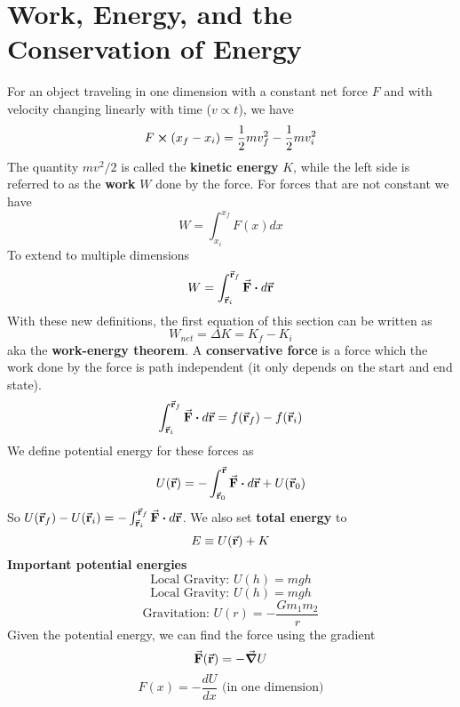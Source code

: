 \section{Work, Energy, and the Conservation of Energy}
    For an object traveling in one dimension with a constant net force $F$ and with velocity changing linearly with time ($v \propto t$), we have
    \begin{equation*}
        F \cross (x_f - x_i) = \frac{1}{2}mv_f^2 - \frac{1}{2}mv_i^2
    \end{equation*}
    The quantity $mv^2 / 2$ is called the \textbf{kinetic energy} $K$, while the left side is referred to as the \textbf{work} $W$ done by the force. For forces that are not constant we have
    \begin{equation*}
        W = \int_{x_i}^{x_f}F(x) dx
    \end{equation*}
    To extend to multiple dimensions
    \begin{equation*}
        W = \int_{\va{r}_i}^{\va{r}_f} \va{F} \vdot d\va{r}
    \end{equation*}
    With these new definitions, the first equation of this section can be written as
    \begin{equation*}
        W_{net} = \Delta K = K_f - K_i
    \end{equation*}
    aka the \textbf{work-energy theorem}. A \textbf{conservative force} is a force which the work done by the force is path independent (it only depends on the start and end state).
    \begin{equation*}
        \int_{\va{r}_i}^{\va{r}_f} \va{F} \vdot d\va{r} = f(\va{r}_f) - f(\va{r}_i)
    \end{equation*}
    We define potential energy for these forces as
    \begin{equation*}
        U(\va{r}) = - \int_{\va{r}_0}^{\va{r}} \va{F} \vdot d\va{r} + U(\va{r}_0)
    \end{equation*}
    So $U(\va{r}_f) - U(\va{r}_i) = - \int_{\va{r}_i}^{\va{r}_f} \va{F} \vdot d\va{r}$. We also set \textbf{total energy} to 
    \begin{equation*}
        E \equiv U(\va{r}) + K
    \end{equation*}
    \textbf{Important potential energies}
    \begin{equation*}
        \text{Local Gravity: } U(h) = mgh
    \end{equation*}
    \begin{equation*}
        \text{Local Gravity: } U(h) = mgh
    \end{equation*}
    \begin{equation*}
        \text{Gravitation: } U(r) = - \frac{Gm_1m_2}{r}
    \end{equation*}
    Given the potential energy, we can find the force using the gradient
    \begin{equation*}
        \va{F}(\va{r}) = -\va{\grad}U
    \end{equation*}
    \begin{equation*}
        F(x) = - \frac{dU}{dx} \text{ (in one dimension)}
    \end{equation*}
